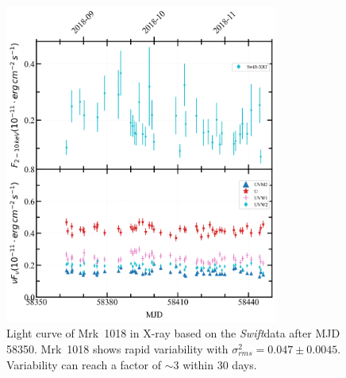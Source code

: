 \documentclass[twocolumn]{aastex63}
\newcommand{\swift}{{\em Swift}}
\begin{document}
\begin{figure}
\centering
	\includegraphics[width=0.8\textwidth]{./pic/subplots-xrt_uvot-radio-second-right-part.png}
    \caption{Light curve of Mrk~1018 in X-ray based on the \swift data after MJD 58350. Mrk~1018 shows rapid variability with $\sigma^2_{rms} = 0.047 \pm 0.0045 $. Variability can reach a factor of $\sim3$ within 30 days.}
    \label{fig:x-ray-lc-rp-secondaxis}
\end{figure}
\end{document}
